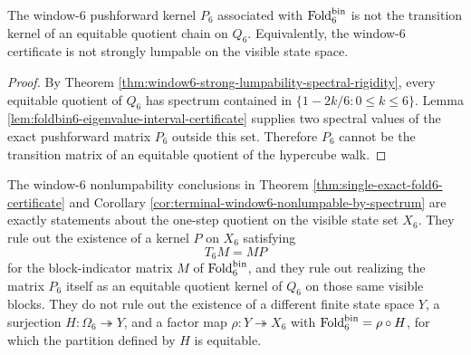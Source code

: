 \begin{corollary}\label{cor:terminal-window6-nonlumpable-by-spectrum}
The window-\(6\) pushforward kernel \(P_6\) associated with \(\operatorname{Fold}_6^{\mathrm{bin}}\) is not the transition kernel of an equitable quotient chain on \(Q_6\).  Equivalently, the window-\(6\) certificate is not strongly lumpable on the visible state space.
\end{corollary}

\begin{proof}
By Theorem \ref{thm:window6-strong-lumpability-spectral-rigidity}, every equitable quotient of \(Q_6\) has spectrum contained in
\(
\{1-2k/6:0\le k\le 6\}
\).
Lemma \ref{lem:foldbin6-eigenvalue-interval-certificate} supplies two spectral values of the exact pushforward matrix \(P_6\) outside this set.  Therefore \(P_6\) cannot be the transition matrix of an equitable quotient of the hypercube walk. \qedhere
\end{proof}

\begin{theorem}\label{thm:hidden-refinement-boundary}
The window-\(6\) nonlumpability conclusions in Theorem \ref{thm:single-exact-fold6-certificate} and Corollary \ref{cor:terminal-window6-nonlumpable-by-spectrum} are exactly statements about the one-step quotient on the visible state set \(X_6\).  They rule out the existence of a kernel \(P\) on \(X_6\) satisfying
\[
T_6M=MP
\]
for the block-indicator matrix \(M\) of \(\operatorname{Fold}_6^{\mathrm{bin}}\), and they rule out realizing the matrix \(P_6\) itself as an equitable quotient kernel of \(Q_6\) on those same visible blocks.  They do not rule out the existence of a different finite state space \(Y\), a surjection \(H:\Omega_6\twoheadrightarrow Y\), and a factor map \(\rho:Y\twoheadrightarrow X_6\) with \(\operatorname{Fold}_6^{\mathrm{bin}}=\rho\circ H\), for which the partition defined by \(H\) is equitable.
\end{theorem}

